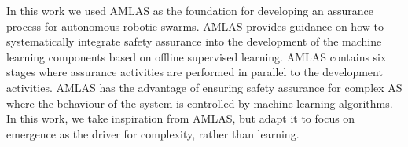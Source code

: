 \documentclass[runningheads]{llncs}
\begin{document}
In this work we used AMLAS \cite{Hawkins2021} as the foundation for developing an assurance process for autonomous robotic swarms. 
AMLAS provides guidance on how to systematically integrate safety assurance into the development of the machine learning components based on offline supervised learning. 
AMLAS contains six stages where assurance activities are performed in parallel to the development activities. 
AMLAS has the advantage of ensuring safety assurance for complex AS where the behaviour of the system is controlled by machine learning algorithms. 
In this work, we take inspiration from AMLAS, but adapt it to focus on emergence as the driver for complexity, rather than learning. 
\end{document}
